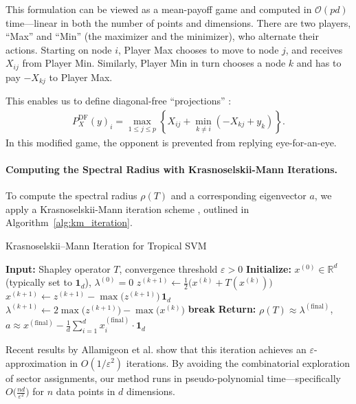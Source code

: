 \documentclass{article}
\newcommand{\R}{\mathbb{R}}
\begin{document}
This formulation can be viewed as a mean-payoff game \cite{akian2020} and computed in $\mathcal{O}(pd)$ time—linear in both the number of points and dimensions.
There are two players, ``Max'' and ``Min'' (the maximizer
and the minimizer), who alternate their actions. Starting on node
$i$, Player Max chooses to move to node $j$, and receives $X_{ij}$
from Player Min. Similarly, Player Min in turn chooses a node $k$
and has to pay $-X_{kj}$ to Player Max.

This enables us to define diagonal-free ``projections'' \cite{gaubert2011}:
\begin{align}
P_X^{\text{DF}}(y)_i = \max_{1 \leq j \leq p} \left\{X_{ij} + \min_{k \neq i} (-X_{kj} + y_k)\right\}.
\end{align}
In this modified game, the opponent is prevented from replying eye-for-an-eye.

\paragraph{Computing the Spectral Radius with Krasnoselskii-Mann Iterations.}
\label{subsec:spectral_computation}
To compute the spectral radius $\rho(T)$ and a corresponding eigenvector $a$, we apply a Krasnoselskii-Mann iteration scheme \cite{baillonbruck},
outlined in Algorithm~\ref{alg:km_iteration}.

\begin{algorithm}
\caption{Krasnoselskii--Mann Iteration for Tropical SVM}\label{alg:km_iteration}
\begin{algorithmic}[1]
\STATE \textbf{Input:} Shapley operator $T$, convergence threshold $\varepsilon > 0$
\STATE \textbf{Initialize:} $x^{(0)} \in \R^d$ (typically set to $\mathbf{1}_d$), $\lambda^{(0)} = 0$
  \STATE $z^{(k+1)} \leftarrow \frac{1}{2}\bigl(x^{(k)} + T(x^{(k)})\bigr)$
  \STATE $x^{(k+1)} \leftarrow z^{(k+1)} - \max\bigl(z^{(k+1)}\bigr)\,\mathbf{1}_d$ 
  \STATE $\lambda^{(k+1)} \leftarrow 2\max\bigl(z^{(k+1)}\bigr) - \max\bigl(x^{(k)}\bigr)$
    \STATE \textbf{break}
  \ENDIF
\ENDFOR
\STATE \textbf{Return:} $\rho(T) \approx \lambda^{(\text{final})}$, $a \approx x^{(\text{final})} - \frac{1}{d}\sum_{i=1}^d x_i^{(\text{final})} \cdot \mathbf{1}_d$
\end{algorithmic}
\end{algorithm}
Recent results by Allamigeon et al. \cite{allamigeon2025} show that this iteration achieves an $\varepsilon$-approximation in $O(1/\varepsilon^2)$ iterations. By avoiding the combinatorial exploration of sector assignments, our method runs in pseudo-polynomial time—specifically $O\bigl(\frac{nd}{\varepsilon^2}\bigr)$ for $n$ data points in $d$ dimensions.
\end{document}
